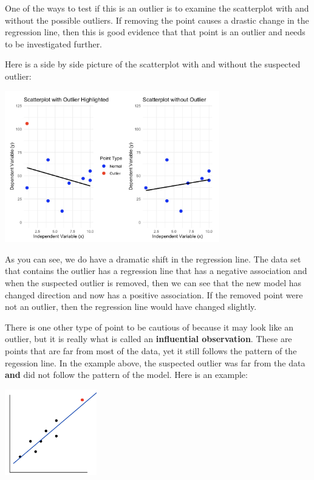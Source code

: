 \documentclass[
  letterpaper,
  DIV=11,
  numbers=noendperiod]{scrreprt}
\begin{document}
One of the ways to test if this is an outlier is to examine the
scatterplot with and without the possible outliers. If removing the
point causes a drastic change in the regression line, then this is good
evidence that that point is an outlier and needs to be investigated
further.

Here is a side by side picture of the scatterplot with and without the
suspected outlier:

\includegraphics[width=0.7\textwidth,height=\textheight]{./images/ROP_6.jpg}

As you can see, we do have a dramatic shift in the regression line. The
data set that contains the outlier has a regression line that has a
negative association and when the suspected outlier is removed, then we
can see that the new model has changed direction and now has a positive
association. If the removed point were not an outlier, then the
regression line would have changed slightly.

There is one other type of point to be cautious of because it may look
like an outlier, but it is really what is called an \textbf{influential
observation}. These are points that are far from most of the data, yet
it still follows the pattern of the regession line. In the example
above, the suspected outlier was far from the data \textbf{and} did not
follow the pattern of the model. Here is an example:

\includegraphics[width=0.3\textwidth,height=\textheight]{./images/ROP_7.jpg}
\end{document}
